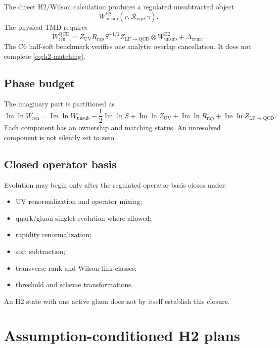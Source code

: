 \documentclass[11pt]{article}
\newcommand{\cR}{\mathcal R}
\newcommand{\trunc}{\mathrm{trunc}}
\newcommand{\UV}{\mathrm{UV}}
\begin{document}
The direct H2/Wilson calculation produces a regulated unsubtracted object
\begin{equation}
 W_{\mathrm{unsub}}^{\mathrm{H2}}
 (r,\cR_{\mathrm{rap}},\gamma).
\end{equation}
The physical TMD requires
\begin{equation}
 W_{\mathrm{ren}}^{\mathrm{QCD}}
 =
 Z_{\UV}
 R_{\mathrm{rap}}
 S^{-1/2}
 Z_{\mathrm{LF}\to\mathrm{QCD}}
 \otimes W_{\mathrm{unsub}}^{\mathrm{H2}}
 +\Delta_{\trunc}.
 \label{eq:h2-matching}
\end{equation}
The C6 half-soft benchmark verifies one analytic overlap cancellation.  It does
not complete \cref{eq:h2-matching}.

\subsection{Phase budget}

The imaginary part is partitioned as
\begin{equation}
 \operatorname{Im}\ln W_{\mathrm{ren}}
 =
 \operatorname{Im}\ln W_{\mathrm{unsub}}
 -\frac12\operatorname{Im}\ln S
 +\operatorname{Im}\ln Z_{\UV}
 +\operatorname{Im}\ln R_{\mathrm{rap}}
 +\operatorname{Im}\ln Z_{\mathrm{LF}\to\mathrm{QCD}}.
\end{equation}
Each component has an ownership and matching status.  An unresolved component
is not silently set to zero.

\subsection{Closed operator basis}

Evolution may begin only after the regulated operator basis closes under:
\begin{itemize}
 \item UV renormalization and operator mixing;
 \item quark/gluon singlet evolution where allowed;
 \item rapidity renormalization;
 \item soft subtraction;
 \item transverse-rank and Wilson-link classes;
 \item threshold and scheme transformations.
\end{itemize}
An H2 state with one active gluon does not by itself establish this closure.

\section{Assumption-conditioned H2 plans}
\end{document}
